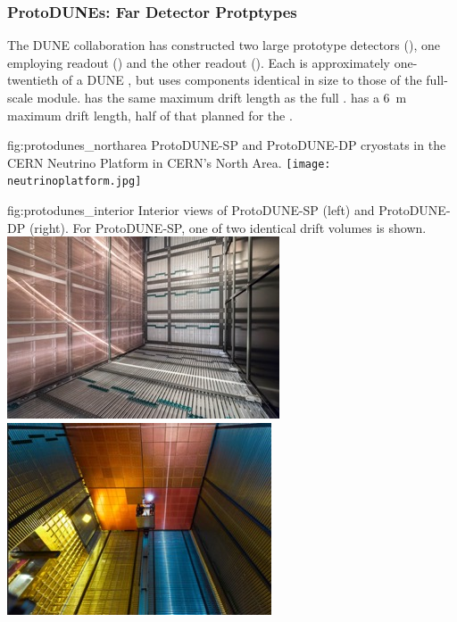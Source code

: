 \subsubsection{ProtoDUNEs: Far Detector Protptypes}

The DUNE collaboration has constructed 
two large prototype detectors (), one employing \single readout () and the other \dual readout (). Each is approximately one-twentieth of a DUNE , but uses components identical in size to those of the full-scale module.  has the same \spmaxdrift maximum drift length as the full .  has a \SI{6}{m} maximum drift length, half of that planned for the . 

\begin{dunefigure}
{fig:protodunes_northarea}
{ProtoDUNE-SP and ProtoDUNE-DP cryostats in the CERN Neutrino Platform in CERN's North Area.}
\texttt{[image: neutrinoplatform.jpg]}
\end{dunefigure}

\begin{dunefigure}
{fig:protodunes_interior}
{Interior views of ProtoDUNE-SP (left) and ProtoDUNE-DP (right). For ProtoDUNE-SP, one of two identical drift volumes is shown.}
\includegraphics[width=0.46\linewidth]{graphics/ProtoDUNE-sp-interior.jpg}\hspace{0.05\linewidth}
\includegraphics[width=0.44\linewidth]{graphics/protodune-dp-interior.jpg}
\end{dunefigure}

